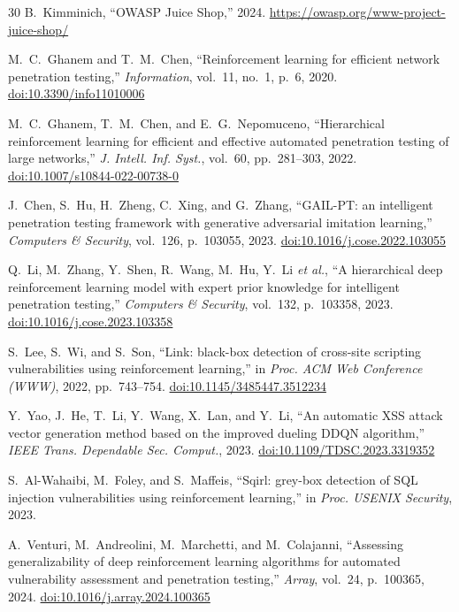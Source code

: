 \documentclass[5p,twocolumn]{elsarticle}
\begin{document}
\begin{thebibliography}{30}
 B.~Kimminich, ``OWASP Juice Shop,'' 2024. \url{https://owasp.org/www-project-juice-shop/}

 M.~C.~Ghanem and T.~M.~Chen, ``Reinforcement learning for efficient network penetration testing,'' \emph{Information}, vol.~11, no.~1, p.~6, 2020. \href{https://doi.org/10.3390/info11010006}{doi:10.3390/info11010006}

 M.~C.~Ghanem, T.~M.~Chen, and E.~G.~Nepomuceno, ``Hierarchical reinforcement learning for efficient and effective automated penetration testing of large networks,'' \emph{J. Intell. Inf. Syst.}, vol.~60, pp.~281--303, 2022. \href{https://doi.org/10.1007/s10844-022-00738-0}{doi:10.1007/s10844-022-00738-0}

 J.~Chen, S.~Hu, H.~Zheng, C.~Xing, and G.~Zhang, ``GAIL-PT: an intelligent penetration testing framework with generative adversarial imitation learning,'' \emph{Computers \& Security}, vol.~126, p.~103055, 2023. \href{https://doi.org/10.1016/j.cose.2022.103055}{doi:10.1016/j.cose.2022.103055}

 Q.~Li, M.~Zhang, Y.~Shen, R.~Wang, M.~Hu, Y.~Li \emph{et al.}, ``A hierarchical deep reinforcement learning model with expert prior knowledge for intelligent penetration testing,'' \emph{Computers \& Security}, vol.~132, p.~103358, 2023. \href{https://doi.org/10.1016/j.cose.2023.103358}{doi:10.1016/j.cose.2023.103358}

 S.~Lee, S.~Wi, and S.~Son, ``Link: black-box detection of cross-site scripting vulnerabilities using reinforcement learning,'' in \emph{Proc. ACM Web Conference (WWW)}, 2022, pp.~743--754. \href{https://doi.org/10.1145/3485447.3512234}{doi:10.1145/3485447.3512234}

 Y.~Yao, J.~He, T.~Li, Y.~Wang, X.~Lan, and Y.~Li, ``An automatic XSS attack vector generation method based on the improved dueling DDQN algorithm,'' \emph{IEEE Trans. Dependable Sec. Comput.}, 2023. \href{https://doi.org/10.1109/TDSC.2023.3319352}{doi:10.1109/TDSC.2023.3319352}

 S.~Al-Wahaibi, M.~Foley, and S.~Maffeis, ``Sqirl: grey-box detection of SQL injection vulnerabilities using reinforcement learning,'' in \emph{Proc. USENIX Security}, 2023.

 A.~Venturi, M.~Andreolini, M.~Marchetti, and M.~Colajanni, ``Assessing generalizability of deep reinforcement learning algorithms for automated vulnerability assessment and penetration testing,'' \emph{Array}, vol.~24, p.~100365, 2024. \href{https://doi.org/10.1016/j.array.2024.100365}{doi:10.1016/j.array.2024.100365}


\end{thebibliography}
\end{document}
